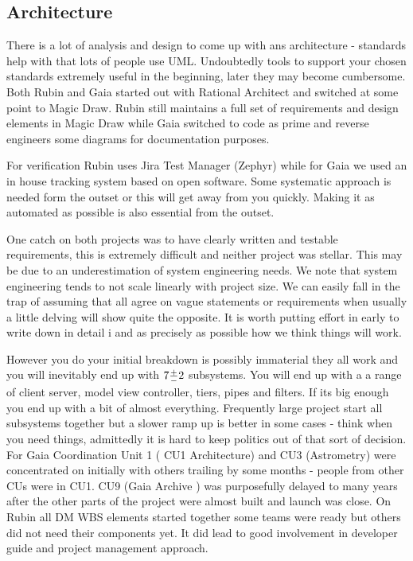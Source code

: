 \documentclass[11pt,twoside]{article}
\begin{document}
\subsection{Architecture}
There is a lot of analysis and design to come up with ans architecture - standards help with that lots of people use UML.
Undoubtedly tools to support your chosen standards extremely useful in the beginning, later they may become cumbersome. Both Rubin and Gaia started out with Rational Architect and switched at some point to Magic Draw.
Rubin still maintains a full set of requirements and design elements in Magic Draw while Gaia switched to code as prime and reverse engineers some diagrams for documentation purposes.

For verification  Rubin uses  Jira Test Manager (Zephyr) while for Gaia we used an in house tracking system based on open software.
Some systematic approach is needed form the outset or this will get away from you quickly.
Making it as automated as possible is also essential from the outset.

One catch on both projects was to have clearly written and testable requirements, this is extremely difficult and neither project was stellar.
This may be due to an underestimation of system engineering needs.
We note that system engineering tends to not scale linearly with project size.
We can easily fall in the trap of assuming that all agree on vague statements or requirements when usually a little delving will show quite the opposite.
It is worth putting effort in early to write down in detail i and as precisely as possible how we think things will work.


However you do your initial breakdown is possibly immaterial they all work and you will inevitably end up with $7 {{+}\over{-}} 2$ subsystems.
You will end up with a a range of client server, model view controller, tiers, pipes and filters.
If its big enough you end up with a bit of almost everything.
Frequently large project start all subsystems together but
a slower ramp up is better in some cases - think when you need things, admittedly it is  hard to keep politics out of that sort of decision.
For Gaia Coordination Unit 1 ( CU1 Architecture) and CU3 (Astrometry) were concentrated on initially with others trailing by some months - people from other CUs were in CU1.
CU9 (Gaia Archive ) was purposefully delayed to many years after the other parts of the project were almost built and launch was close.
On Rubin all DM WBS elements started together
some  teams were ready but others did not need their components  yet.
It did lead to good involvement in developer guide and project management approach.
\end{document}

